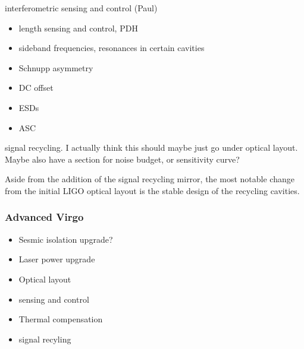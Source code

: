 interferometric sensing and control (Paul)

\begin{itemize}
\item length sensing and control, PDH
\item sideband frequencies, resonances in certain cavities
\item Schnupp asymmetry
\item DC offset
\item ESDs
\item ASC
\end{itemize}

signal recycling. I actually think this should maybe just go under optical layout.
Maybe also have a section for noise budget, or sensitivity curve?








Aside from the addition of the signal recycling mirror, the most notable change from the initial LIGO optical 
layout is the stable design of the recycling cavities.


\subsubsection{Advanced Virgo}
\begin{itemize}
\item Sesmic isolation upgrade?
\item Laser power upgrade
\item Optical layout
\item sensing and control
\item Thermal compensation
\item signal recyling
\end{itemize}